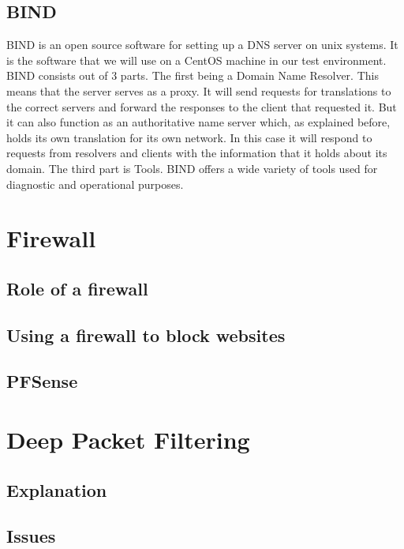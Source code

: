 \subsection{BIND}
BIND is an open source software for setting up a DNS server on unix systems. It is the software that we will use on a CentOS machine in our test environment. BIND consists out of 3 parts. The first being a Domain Name Resolver. This means that the server serves as a proxy. It will send requests for translations to the correct servers and forward the responses to the client that requested it. But it can also function as an authoritative name server which, as explained before, holds its own translation for its own network. In this case it will respond to requests from resolvers and clients with the information that it holds about its domain. The third part is Tools. BIND offers a wide variety of tools used for diagnostic and operational purposes. 
\section{Firewall}
\subsection{Role of a firewall}
\subsection{Using a firewall to block websites}
\subsection{PFSense}
\section{Deep Packet Filtering}
\subsection{Explanation}
\subsection{Issues}




